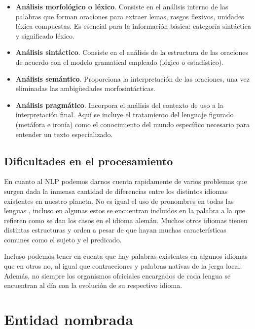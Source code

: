 \documentclass[runningheads]{llncs}
\begin{document}
\begin{itemize}
    \item \textbf{Análisis morfológico o léxico}. Consiste en el análisis interno de las palabras que forman oraciones para extraer lemas, rasgos flexivos, unidades léxica compuestas. Es esencial para la información básica: categoría sintáctica y significado léxico.
    \item \textbf{Análisis sintáctico}. Consiste en el análisis de la estructura de las oraciones de acuerdo con el modelo gramatical empleado (lógico o estadístico).
    \item \textbf{Análisis semántico}. Proporciona la interpretación de las oraciones, una vez eliminadas las ambigüedades morfosintácticas.
    \item \textbf{Análisis pragmático}. Incorpora el análisis del contexto de uso a la interpretación final. Aquí se incluye el tratamiento del lenguaje figurado (metáfora e ironía) como el conocimiento del mundo específico necesario para entender un texto especializado.
\end{itemize}


 
\subsection{Dificultades en el procesamiento}
 
En cuanto al NLP podemos darnos cuenta rapidamente de varios problemas que surgen dada la inmensa cantidad de diferencias entre los distintos idiomas existentes en nuestro planeta. No es igual el uso de pronombres en todas las lenguas , incluso en algunas estos se encuentran incluidos en la palabra a la que refieren como se dan los casos en el idioma alemán. Muchos otros idiomas tienen distintas estructuras y orden a pesar de que hayan muchas características comunes como el sujeto y el predicado.

Incluso podemos tener en cuenta que hay palabras existentes en algunos idiomas que en otros no, al igual que contracciones y palabras nativas de la jerga local. Además, no siempre los organismos ofciciales encargados de cada lengua se encuentran al día con la evolución de su respectivo idioma.


\section{Entidad nombrada}
\end{document}
